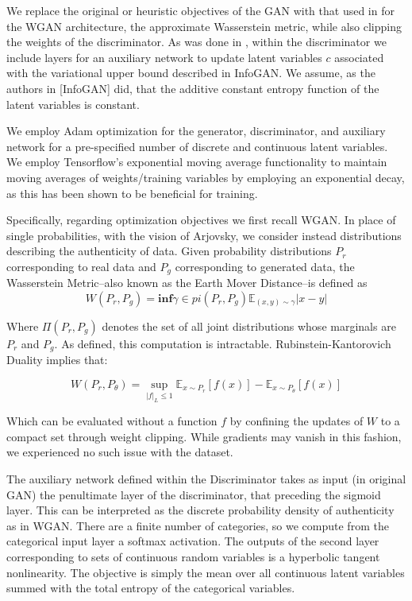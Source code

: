 \documentclass{article}
\begin{document}
	We replace the original or heuristic objectives of the GAN with that used in \cite{Arjovsky2017WassersteinGAN} for the WGAN architecture, the approximate Wasserstein metric, while also clipping the weights of the discriminator.  As was done in \cite{InfoGAN}, within the discriminator we include layers for an auxiliary network to update latent variables $c$ associated with the variational upper bound described in InfoGAN.  We assume, as the authors in [InfoGAN] did, that the additive constant entropy function of the latent variables is constant.
    
	We employ Adam optimization for the generator, discriminator, and auxiliary network for a pre-specified number of discrete and continuous latent variables.  We employ Tensorflow's exponential moving average functionality to maintain moving averages of weights/training variables by employing an exponential decay, as this has been shown to be beneficial for training.
    
Specifically, regarding optimization objectives we first recall WGAN. In place of single probabilities, with the vision of Arjovsky, we consider instead distributions describing the authenticity of data. Given probability distributions $P_r $ corresponding to real data and 
$P_g $ corresponding to generated data, the Wasserstein Metric--also known as the Earth Mover Distance--is defined as
\[
W(P_r,P_g) = \textbf{inf}{\gamma \in pi(P_r ,P_g)} \mathbb{E}_{(x, y) \sim \gamma} |x - y|
\]

Where $ \Pi(P_r,P_g) $ denotes the set of all joint distributions whose marginals are $P_r$ and $P_g$.  As defined, this computation is intractable.   Rubinstein-Kantorovich Duality implies that:
  
\[
W(P_r,P_\theta ) = \sup_{|f|_L \leq 1} \mathbb{E}_{x\sim P_r}[f(x)] - \mathbb{E}_{x \sim P_\theta}[f(x)] 
\]

Which can be evaluated without a function $f $ by confining the updates of $ W $ to a compact set through weight clipping.  While gradients may vanish in this fashion, we experienced no such issue with the dataset. 

The auxiliary network defined within the Discriminator takes as input (in original GAN) the penultimate  layer of the discriminator, that preceding the sigmoid layer.   This can be interpreted as the discrete probability density of authenticity as in WGAN.  There are a finite number of categories, so we compute from the categorical input layer a softmax activation.  The outputs of the second layer corresponding to sets of continuous random variables is a hyperbolic tangent nonlinearity.  The objective is simply the mean over all continuous latent variables summed with the total entropy of the categorical variables.
\end{document}
